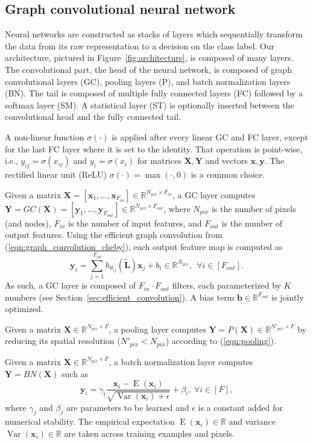 \documentclass[final,twocolumn,3p,times,authoryear]{elsarticle}
\newcommand{\figref}[1]{Figure~\ref{fig:#1}}
\newcommand{\secref}[1]{Section~\ref{sec:#1}}
\newcommand{\eqnref}[1]{(\ref{eqn:#1})}
\renewcommand{\b}[1]{{\bm{#1}}}   %
\newcommand{\1}{\b{1}}              %
\newcommand{\0}{\b{0}}              %
\renewcommand{\L}{\b{L}}
\newcommand{\tL}{\tilde{\L}}
\newcommand{\x}{\b{x}}
\newcommand{\X}{\b{X}}
\newcommand{\y}{\b{y}}
\newcommand{\Y}{\b{Y}}
\newcommand{\R}{\mathbb{R}}
\DeclareMathOperator*{\esp}{E}
\DeclareMathOperator*{\var}{Var}
\begin{document}
\subsection{Graph convolutional neural network}
\label{sec:architecture}

Neural networks are constructed as stacks of layers which sequentially transform the data from its raw representation to a decision on the class label. Our architecture, pictured in \figref{architecture}, is composed of many layers. The convolutional part, the head of the neural network, is composed of graph convolutional layers (GC), pooling layers (P), and batch normalization layers (BN). The tail is composed of multiple fully connected layers (FC) followed by a softmax layer (SM). A statistical layer (ST) is optionally inserted between the convolutional head and the fully connected tail.

A non-linear function $\sigma(\cdot)$ is applied after every linear GC and FC layer, except for the last FC layer where it is set to the identity. That operation is point-wise, i.e., $y_{ij} = \sigma(x_{ij})$ and $y_i = \sigma(x_i)$ for matrices $\X, \Y$ and vectors $\x, \y$. The rectified linear unit (ReLU) $\sigma(\cdot) = \max(\cdot, 0)$ is a common choice.

Given a matrix $\X = [\x_1, \ldots, \x_{F_{in}}] \in \R^{N_{pix} \times F_{in}}$, a GC layer computes $\Y = GC(\X) = [\y_1, \ldots, \y_{F_{out}}] \in \R^{N_{pix} \times F_{out}}$, where $N_{pix}$ is the number of pixels (and nodes), $F_{in}$ is the number of input features, and $F_{out}$ is the number of output features.
Using the efficient graph convolution from \eqnref{graph_convolution_cheby}, each output feature map is computed as
\begin{equation*}
	\y_i = \sum_{j=1}^{F_{in}} h_{\theta_{ij}}(\tL) \x_j + b_i \in \R^{N_{pix}}, \ \ \forall i \in [F_{out}].
\end{equation*}
As such, a GC layer is composed of $F_{in} \cdot F_{out}$ filters, each parameterized by $K$ numbers (see \secref{efficient_convolution}). A bias term $\b b \in \R^{F_{out}}$ is jointly optimized.

Given a matrix $\X \in \R^{N_{pix} \times F}$, a pooling layer computes $\Y = P(\X) \in \R^{N'_{pix} \times F}$ by reducing its spatial resolution ($N'_{pix} < N_{pix}$) according to \eqnref{pooling}.

Given a matrix $\X \in \R^{N_{pix} \times F}$, a batch normalization layer \citep{ioffe2015batchnorm} computes $\Y = BN(\X)$ such as
\begin{equation*}
	\y_i = \gamma_i \frac{\x_i - \esp(\x_i)}{\sqrt{\var(\x_i) + \epsilon}} + \beta_i, \ \forall i \in [F],
\end{equation*}
where $\gamma_{j}$ and $\beta_{j}$ are parameters to be learned and $\epsilon$ is a constant added for numerical stability. The empirical expectation $\esp(\x_i) \in \R$ and variance $\var(\x_i) \in \R$ are taken across training examples and pixels.
\end{document}

